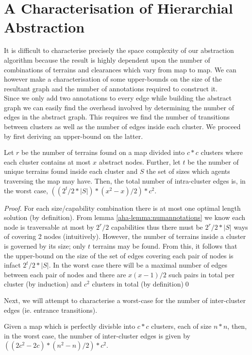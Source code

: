 \section{A Characterisation of Hierarchial Abstraction}
It is difficult to characterise precisely the space complexity of our abstraction algorithm because the result is highly dependent upon the number of combinations of terrains and clearances which vary from map to map. We can however make a characterisation of some upper-bounds on the size of the resultant graph and the number of annotations required to construct it. \\
Since we only add two annotations to every edge while building the abstract graph we can easily find the overhead involved by determining the number of edges in the abstract graph. This requires we find the number of transitions between clusters as well as the number of edges inside each cluster. We proceed by first deriving an upper-bound on the latter. 
\begin{lemma}
\label{aha-lemma:maxedgesincluster}
Let $r$ be the number of terrains found on a map divided into $c*c$ clusters where each cluster contains at most $x$ abstract nodes. Further, let $t$ be the number of unique terrains found inside each cluster and $S$ the set of sizes which agents traversing the map may have. Then, the total number of intra-cluster edges is, in the worst case, $((2^t/2 * |S|) *(x^2-x)/2)*c^2$.
\end{lemma}

\begin{proof}
For each size/capability combination there is at most one optimal length solution (by definition). From lemma \ref{aha-lemma:numannotations} we know each node is traversable at most by $2^r/2$ capabilities thus there must be $2^r/2 * |S|$ ways of covering 2 nodes (intuitively). 
However, the number of terrains inside a cluster is governed by its size; only $t$ terrains may be found. From this, it follows that the upper-bound on the size of the set of edges covering each pair of nodes is infact $2^t/2 * |S|$. In the worst case there will be a maximal number of edges between each pair of nodes and there are $x(x-1)/2$ such pairs in total per cluster (by induction) and $c^2$ clusters in total (by definition)\qed
\end{proof}

Next, we will attempt to characterise a worst-case for the number of inter-cluster edges (ie. entrance transitions). 
\begin{lemma}
\label{aha-lemma:maxtransitions}
Given a map which is perfectly divisble into $c*c$ clusters, each of size $n*n$, then, in the worst case, the number of inter-cluster edges is given by $((2c^2 - 2c)*(n^2-n)/2)*c^2$.
\end{lemma}

